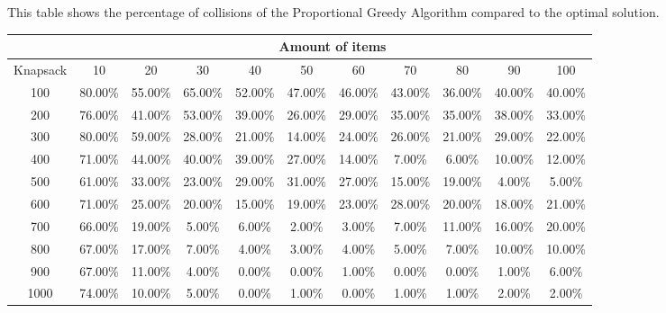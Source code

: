 \documentclass{report}
\begin{document}
This table shows the percentage of collisions of the Proportional Greedy Algorithm compared to the optimal solution.
\begin{table}[H]
\hspace{-3cm}
\begin{tabular}{|c|c|c|c|c|c|c|c|c|c|c|}
\hline
& \multicolumn{10}{c|}{Amount of items} \\
\hline
Knapsack & 10 & 20 & 30 & 40 & 50 & 60 & 70 & 80 & 90 & 100 \\
\hline
100 & 80.00\% & 55.00\% & 65.00\% & 52.00\% & 47.00\% & 46.00\% & 43.00\% & 36.00\% & 40.00\% & 40.00\% \\ 
\hline
200 & 76.00\% & 41.00\% & 53.00\% & 39.00\% & 26.00\% & 29.00\% & 35.00\% & 35.00\% & 38.00\% & 33.00\% \\ 
\hline
300 & 80.00\% & 59.00\% & 28.00\% & 21.00\% & 14.00\% & 24.00\% & 26.00\% & 21.00\% & 29.00\% & 22.00\% \\ 
\hline
400 & 71.00\% & 44.00\% & 40.00\% & 39.00\% & 27.00\% & 14.00\% & 7.00\% & 6.00\% & 10.00\% & 12.00\% \\ 
\hline
500 & 61.00\% & 33.00\% & 23.00\% & 29.00\% & 31.00\% & 27.00\% & 15.00\% & 19.00\% & 4.00\% & 5.00\% \\ 
\hline
600 & 71.00\% & 25.00\% & 20.00\% & 15.00\% & 19.00\% & 23.00\% & 28.00\% & 20.00\% & 18.00\% & 21.00\% \\ 
\hline
700 & 66.00\% & 19.00\% & 5.00\% & 6.00\% & 2.00\% & 3.00\% & 7.00\% & 11.00\% & 16.00\% & 20.00\% \\ 
\hline
800 & 67.00\% & 17.00\% & 7.00\% & 4.00\% & 3.00\% & 4.00\% & 5.00\% & 7.00\% & 10.00\% & 10.00\% \\ 
\hline
900 & 67.00\% & 11.00\% & 4.00\% & 0.00\% & 0.00\% & 1.00\% & 0.00\% & 0.00\% & 1.00\% & 6.00\% \\ 
\hline
1000 & 74.00\% & 10.00\% & 5.00\% & 0.00\% & 1.00\% & 0.00\% & 1.00\% & 1.00\% & 2.00\% & 2.00\% \\ 
\hline
\end{tabular}
\end{table}


\end{document}
